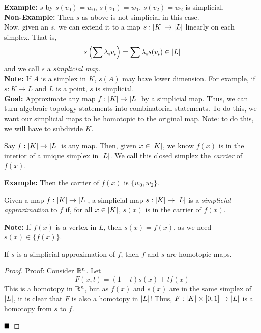 \textbf{Example:}
$s$ by $s(v_0) = w_0$, $s(v_1) = w_1$, $s(v_2) = w_2$ is simplicial.\\

\textbf{Non-Example:}
Then $s$ as above is not simplicial in this case.\\

Now, given an $s$, we can extend it to a map $s : \left\lvert {K} \right\rvert \to \left\lvert {L} \right\rvert$ linearly on each simplex. That is,
\[ s\left(\sum \lambda_iv_i\right) = \sum \lambda_is(v_i) \in \left\lvert {L} \right\rvert \]
and we call $s$ a \emph{simplicial map}.\\

\textbf{Note:} If $A$ is a simplex in $K$, $s(A)$ may have lower dimension. For example, if $s : K \to L$ and $L$ is a point, $s$ is simplicial.\\

\textbf{Goal:} Approximate any map $f : \left\lvert {K} \right\rvert \to \left\lvert {L} \right\rvert$ by a simplicial map. Thus, we can turn algebraic topology statements into combinatorial statements. To do this, we want our simplicial maps to be homotopic to the original map. Note: to do this, we will have to subdivide $K$.

\begin{definition}
    Say $f : \left\lvert {K} \right\rvert \to \left\lvert {L} \right\rvert$ is any map. Then, given $x \in \left\lvert {K} \right\rvert$, we know $f(x)$ is in the interior of a unique simplex in $\left\lvert {L} \right\rvert$. We call this closed simplex the \emph{carrier} of $f(x)$.
\end{definition}

\textbf{Example:}
Then the carrier of $f(x)$ is $\{w_0, w_2\}$.

\begin{definition}
    Given a map $f : \left\lvert {K} \right\rvert \to \left\lvert {L} \right\rvert$, a simplicial map $s : \left\lvert {K} \right\rvert \to \left\lvert {L} \right\rvert$ is a \emph{simplicial approximation} to $f$ if, for all $x \in \left\lvert {K} \right\rvert$, $s(x)$ is in the carrier of $f(x)$.
\end{definition}

\textbf{Note:} If $f(x)$ is a vertex in $L$, then $s(x) = f(x)$, as we need $s(x) \in \{f(x)\}$.

\begin{lemma}
    If $s$ is a simplicial approximation of $f$, then $f$ and $s$ are homotopic maps.
\end{lemma}
\begin{proof}{Proof:}
    Consider $\mathbb{R}^n$. Let
    \[ F(x, t) = (1 - t)s(x) + tf(x) \]
    This is a homotopy in $\mathbb{R}^n$, but as $f(x)$ and $s(x)$ are in the same simplex of $\left\lvert {L} \right\rvert$, it is clear that $F$ is also a homotopy in $\left\lvert {L} \right\rvert$! Thus, $F : \left\lvert {K} \right\rvert \times [0, 1] \to \left\lvert {L} \right\rvert$ is a homotopy from $s$ to $f$.

    $\qed$
\end{proof}

